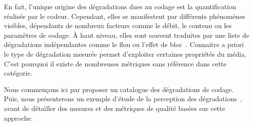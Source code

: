 En fait, l'unique origine des dégradations dues au codage est la quantification réalisée par le codeur. Cependant, elles se manifestent par différents phénomènes visibles, dépendants de nombreux facteurs comme le débit, le contenu ou les paramètres de codage. À haut niveau, elles sont souvent traduites par une liste de dégradations indépendantes comme le flou ou l'effet de bloc~\cite{yuen-sp1998, bretillon-phd, punchihewa-ivcnz2002, crete-phd}. Connaitre a priori le type de dégradation mesurée permet d'exploiter certaines propriétés du média. C'est pourquoi il existe de nombreuses métriques sans référence dans cette catégorie.

Nous commençons ici par proposer un catalogue des dégradations de codage. Puis, nous présenterons un exemple d'étude de la perception des dégradations~\cite{farias-phd}, avant de détailler des mesures et des métriques de qualité basées sur cette approche.


